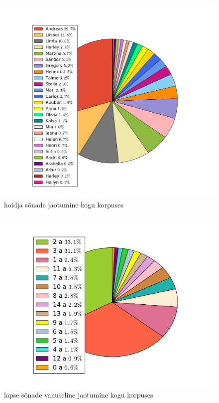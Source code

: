 \documentclass[12pt]{article}
\begin{document}
\begin{figure}[H]
    \centering
    \includegraphics[width=\textwidth]{hoidja_sonad_kogu_korpuses}
    \caption{hoidja sõnade jaotumine kogu korpuses}
\end{figure}

\begin{figure}[H]
    \centering
    \includegraphics[width=\textwidth]{vanus_laps_sonad}
    \caption{lapse sõnade vanuseline jaotumine kogu korpuses}
\end{figure}
\end{document}
